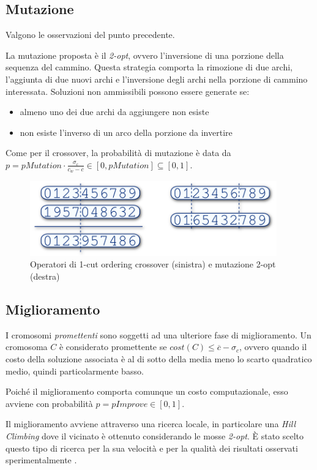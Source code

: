 \documentclass[a4paper, 10pt]{report}
\begin{document}
\subsection{Mutazione}
Valgono le osservazioni del punto precedente.

La mutazione proposta è il \emph{2-opt}, ovvero l'inversione di una
porzione della sequenza del cammino. Questa strategia comporta la
rimozione di due archi, l'aggiunta di due nuovi archi e l'inversione
degli archi nella porzione di cammino interessata. Soluzioni non
ammissibili possono essere generate se:
\begin{itemize}
  \item almeno uno dei due archi da aggiungere non esiste
  \item non esiste l'inverso di un arco della porzione da invertire
\end{itemize}

Come per il crossover, la probabilità di mutazione è data da 
$p = pMutation \cdot \frac{\sigma_c}{c_w - \overline{c}} \in [0, pMutation] \subseteq [0, 1]$.

\begin{figure}
  \centering
  \includegraphics[width=0.95\textwidth]{images/fig-crossover-mutation}
  \caption{Operatori di 1-cut ordering crossover (sinistra) e mutazione 2-opt (destra)}
  \label{fig:crossover-mutation}
\end{figure}


\subsection{Miglioramento}
I cromosomi \emph{promettenti} sono soggetti ad una ulteriore fase di
miglioramento. Un cromosoma $C$ è considerato promettente se
$cost(C) \leq \overline{c} - \sigma_c$, ovvero quando il costo della
soluzione associata è al di sotto della media meno lo scarto quadratico
medio, quindi particolarmente basso.

Poiché il miglioramento comporta comunque un costo computazionale, esso
avviene con probabilità $p = pImprove \in [0, 1]$.

Il miglioramento avviene attraverso una ricerca locale, in particolare
una \emph{Hill Climbing} dove il vicinato è ottenuto considerando le
mosse \emph{2-opt}. È stato scelto questo tipo di ricerca per la sua
velocità e per la qualità dei risultati osservati sperimentalmente
\cite[Ulder et al.]{ulder1991}.
\end{document}
